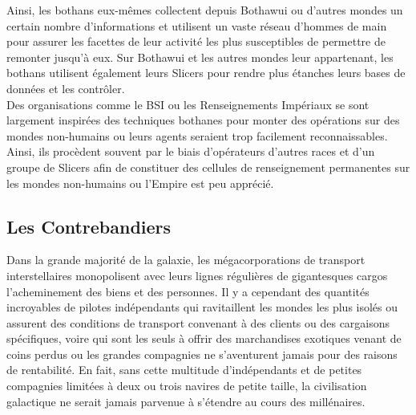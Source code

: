 \documentclass[twoside]{article}
\begin{document}
Ainsi, les bothans eux-mêmes collectent depuis Bothawui ou d'autres mondes un certain nombre d'informations et utilisent un vaste réseau d'hommes de main pour assurer les facettes de leur activité les plus susceptibles de permettre de remonter jusqu'à eux. Sur Bothawui et les autres mondes leur appartenant, les bothans utilisent également leurs Slicers pour rendre plus étanches leurs bases de données et les contrôler.\\

Des organisations comme le BSI ou les Renseignements Impériaux se sont largement inspirées des techniques bothanes pour monter des opérations sur des mondes non-humains ou leurs agents seraient trop facilement reconnaissables. Ainsi, ils procèdent souvent par le biais d'opérateurs d'autres races et d'un groupe de Slicers afin de constituer des cellules de renseignement permanentes sur les mondes non-humains ou l'Empire est peu apprécié.

\subsection{Les Contrebandiers}
Dans la grande majorité de la galaxie, les mégacorporations de transport interstellaires monopolisent avec leurs lignes régulières de gigantesques cargos l'acheminement des biens et des personnes. Il y a cependant des quantités incroyables de pilotes indépendants qui ravitaillent les mondes les plus isolés ou assurent des conditions de transport convenant à des clients ou des cargaisons spécifiques, voire qui sont les seuls à offrir des marchandises exotiques venant de coins perdus ou les grandes compagnies ne s'aventurent jamais pour des raisons de rentabilité. En fait, sans cette multitude d'indépendants et de petites compagnies limitées à deux ou trois navires de petite taille, la civilisation galactique ne serait jamais parvenue à s'étendre au cours des millénaires.\\
\end{document}
